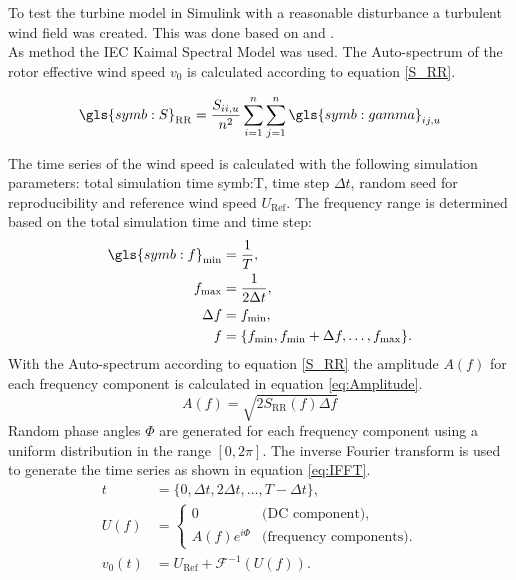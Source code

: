 To test the turbine model in Simulink with a reasonable disturbance a turbulent wind field was created. This was done based on \cite{IEC61400-1} and \cite{SchlipfLecture}. \\
As method the IEC Kaimal Spectral Model \cite{IEC61400-1} was used. The Auto-spectrum of the rotor effective wind speed $v_0$ is calculated according to equation \ref{S_RR}.

\begin{equation}
	\gls{symb:S}_{\text{RR}} = \frac{S_{ii,u}}{n^2}\sum_{i=1}^{n}\sum_{j=1}^{n}\gls{symb:gamma}_{ij,u}	
	\label{S_RR}
\end{equation}

The time series of the wind speed is calculated with the following simulation parameters: total simulation time \gls{symb:T}, time step $\Delta t$, random seed for reproducibility and reference wind speed $U_{\text{Ref}}$. The frequency range is determined based on the total simulation time and time step:
\begin{align*}
	\gls{symb:f}_{\min} &= \frac{1}{T}, \\
	f_{\max} &= \frac{1}{2\Delta t}, \\
	\Delta f &= f_{\min},\\
	f &= \{f_{\min}, f_{\min} + \Delta f, \ldots, f_{\max}\}.
\end{align*}
With the Auto-spectrum according to equation \ref{S_RR} the amplitude $A(f)$ for each frequency component is calculated in equation \ref{eq:Amplitude}.
\begin{equation}
	A(f) = \sqrt{2 S_{\text{RR}}(f) \Delta f}
	\label{eq:Amplitude}
\end{equation}
Random phase angles $\Phi$ are generated for each frequency component using a uniform distribution in the range $[0, 2\pi]$.
The inverse Fourier transform is used to generate the time series as shown in equation \ref{eq:IFFT}.
\begin{equation}
	\begin{aligned}
		t &= \{0, \Delta t, 2\Delta t, \ldots, T - \Delta t\}, \\
		U(f) &= 
		\begin{cases}
			0 & \text{(DC component)}, \\
			A(f) e^{i\Phi} & \text{(frequency components)}.
		\end{cases} \\
		v_0(t) &= U_{\text{Ref}} + \mathcal{F}^{-1}(U(f)).
	\end{aligned}
	\label{eq:IFFT}
\end{equation}

